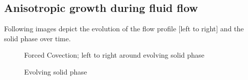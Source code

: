 \documentclass[12pt,a4paper]{report}
\begin{document}
	\subsection*{Anisotropic growth during fluid flow}
	Following images depict the evolution of the flow profile 
	[left to right] and the solid phase over time.
			\begin{figure}[H]
				\centering
				\hspace{.25in}
				\centering
				\caption{Forced Covection; left to right around evolving solid phase}
			\end{figure}
			\begin{figure}[!h]
				\centering
				\hspace{.25in}
				\centering
				\caption{Evolving solid phase}
			\end{figure}
\newpage
\end{document}
